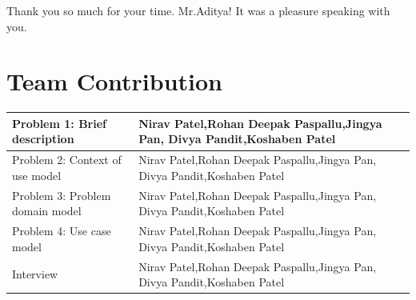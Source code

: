 \documentclass[11pt, english]{report}
\begin{document}
Thank you so much for your time. Mr.Aditya! It was a pleasure speaking with you. \\

\newpage
\chapter{Team Contribution}

\begin{center}
\begin{tabular}{ | m{20em} | m{8cm}| } 
\hline
 Problem 1: Brief description& Nirav Patel,Rohan Deepak Paspallu,Jingya Pan,
Divya Pandit,Koshaben Patel\\ 
\hline
Problem 2: Context of use model & Nirav Patel,Rohan Deepak Paspallu,Jingya Pan,
Divya Pandit,Koshaben Patel\\ 
\hline
Problem 3: Problem domain model & Nirav Patel,Rohan Deepak Paspallu,Jingya Pan,
Divya Pandit,Koshaben Patel\\ 
\hline
Problem 4: Use case model & Nirav Patel,Rohan Deepak Paspallu,Jingya Pan,
Divya Pandit,Koshaben Patel\\ 
\hline
Interview & Nirav Patel,Rohan Deepak Paspallu,Jingya Pan,
Divya Pandit,Koshaben Patel\\ 
\hline
\end{tabular}
\end{center}


\newpage
\printbibliography
\newpage
\printglossary
\end{document}
